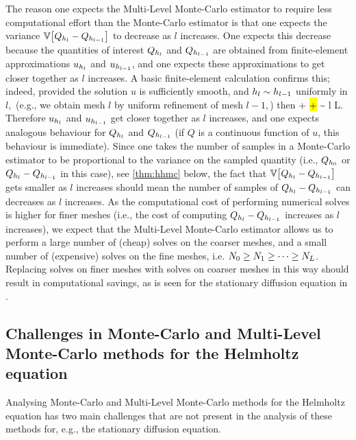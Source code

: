 The reason one expects the Multi-Level Monte-Carlo estimator to require less computational effort than the Monte-Carlo estimator is that one expects the variance $\VAR{\Qhl-\Qhlmo}$ to decrease as $l$ increases. One expects this decrease because the quantities of interest $Q_{h_{l}}$ and $Q_{h_{l-1}}$ are obtained from finite-element approximations $u_{h_{l}}$ and $u_{h_{l-1}}$, and one expects these approximations to get closer together as $l$ increases. A basic finite-element calculation confirms this; indeed, provided the solution $u$ is sufficiently smooth, and $h_{l} \sim h_{l-1}$ uniformly in $l,$ (e.g., we obtain mesh $l$ by uniform refinement of mesh $l-1,$) then
\beqs
\NHo{\uhl - \uhlmo} \leq {} +  \lesssim \hl + \hlmo \sim \hlmo {}  l \rightarrow L.
\eeqs
Therefore $u_{h_{l}}$ and $u_{h_{l-1}}$ get closer together as $l$ increases, and one expects analogous behaviour for $Q_{h_{l}}$ and $Q_{h_{l-1}}$ (if $Q$ is a continuous function of $u$, this behaviour is immediate). Since one takes the number of samples in a Monte-Carlo estimator to be proportional to the variance on the sampled quantity (i.e., $Q_{h_{0}}$ or $Q_{h_{l}}-Q_{h_{l-1}}$ in this case), see \cref{thm:hhmc} below, the fact that $\VAR{\Qhl-\Qhlmo}$ gets smaller as $l$ increases should mean the number of samples of $Q_{h_{l}}-Q_{h_{l-1}}$ can decreases as $l$ increases. As the computational cost of performing numerical solves is higher for finer meshes (i.e., the cost of computing $Q_{h_{l}}-Q_{h_{l-1}}$ increases as $l$ increases), we expect that the Multi-Level Monte-Carlo estimator allows us to perform a large number of (cheap) solves on the coarser meshes, and a small number of (expensive) solves on the fine meshes, i.e. $N_{0} \geq N_{1} \geq \cdots \geq N_{L}$. Replacing solves on finer meshes with solves on coarser meshes in this way should result in computational savings, as is seen for the stationary diffusion equation in \cite{ClGiScTe:11}.

\subsection{Challenges in Monte-Carlo and Multi-Level Monte-Carlo methods for the Helmholtz equation}\label{sec:mlmcchallenges}

Analysing Monte-Carlo and Multi-Level Monte-Carlo methods for the Helmholtz equation has two main challenges that are not present in the analysis of these methods for, e.g., the stationary diffusion equation.

